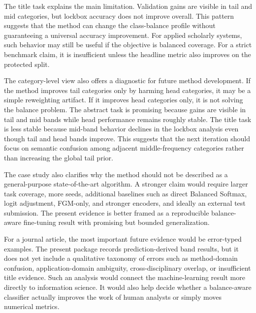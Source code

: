 \documentclass[10pt]{article}
\begin{document}
\begin{table}[t]
\centering
\caption{Category-band analysis derived from prediction files. Examples are counted after pooling three seeds, so each validation or lockbox example contributes once per seed.}
\label{tab:category_delta}

\end{table}

The title task explains the main limitation. Validation gains are visible in tail and mid categories, but lockbox accuracy does not improve overall. This pattern suggests that the method can change the class-balance profile without guaranteeing a universal accuracy improvement. For applied scholarly systems, such behavior may still be useful if the objective is balanced coverage. For a strict benchmark claim, it is insufficient unless the headline metric also improves on the protected split.

The category-level view also offers a diagnostic for future method development. If the method improves tail categories only by harming head categories, it may be a simple reweighting artifact. If it improves head categories only, it is not solving the balance problem. The abstract task is promising because gains are visible in tail and mid bands while head performance remains roughly stable. The title task is less stable because mid-band behavior declines in the lockbox analysis even though tail and head bands improve. This suggests that the next iteration should focus on semantic confusion among adjacent middle-frequency categories rather than increasing the global tail prior.

The case study also clarifies why the method should not be described as a general-purpose state-of-the-art algorithm. A stronger claim would require larger task coverage, more seeds, additional baselines such as direct Balanced Softmax, logit adjustment, FGM-only, and stronger encoders, and ideally an external test submission. The present evidence is better framed as a reproducible balance-aware fine-tuning result with promising but bounded generalization.

For a journal article, the most important future evidence would be error-typed examples. The present package records prediction-derived band results, but it does not yet include a qualitative taxonomy of errors such as method-domain confusion, application-domain ambiguity, cross-disciplinary overlap, or insufficient title evidence. Such an analysis would connect the machine-learning result more directly to information science. It would also help decide whether a balance-aware classifier actually improves the work of human analysts or simply moves numerical metrics.
\end{document}
